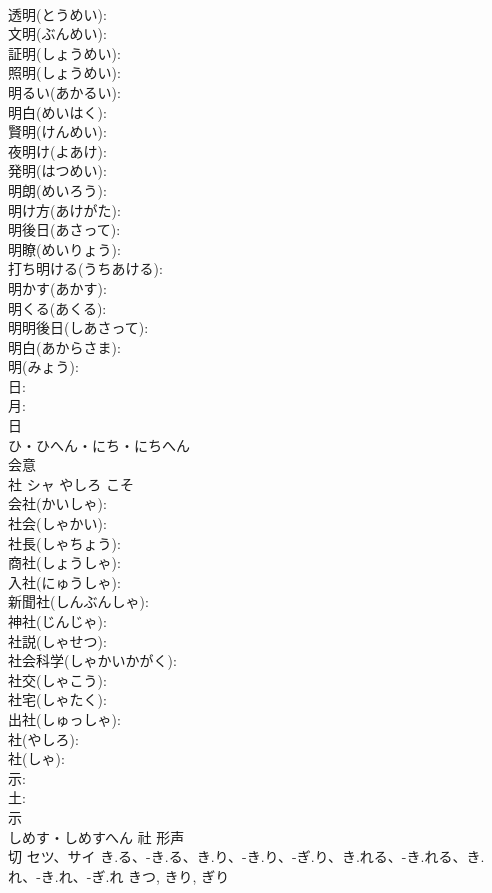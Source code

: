 \documentclass[8pt]{extreport}
\begin{document}
\begin{CJK}{UTF8}{min}
\\	透明(とうめい): 
\\	文明(ぶんめい): 
\\	証明(しょうめい): 
\\	照明(しょうめい): 
\\	明るい(あかるい): 
\\	明白(めいはく): 
\\	賢明(けんめい): 
\\	夜明け(よあけ): 
\\	発明(はつめい): 
\\	明朗(めいろう): 
\\	明け方(あけがた): 
\\	明後日(あさって): 
\\	明瞭(めいりょう): 
\\	打ち明ける(うちあける): 
\\	明かす(あかす): 
\\	明くる(あくる): 
\\	明明後日(しあさって): 
\\	明白(あからさま): 
\\	明(みょう): 
\\	日: 
\\	月: 
\\	日	
\\	ひ・ひへん・にち・にちへん	
\\	会意 
\\	社	シャ	やしろ	こそ	
\\	会社(かいしゃ): 
\\	社会(しゃかい): 
\\	社長(しゃちょう): 
\\	商社(しょうしゃ): 
\\	入社(にゅうしゃ): 
\\	新聞社(しんぶんしゃ): 
\\	神社(じんじゃ): 
\\	社説(しゃせつ): 
\\	社会科学(しゃかいかがく): 
\\	社交(しゃこう): 
\\	社宅(しゃたく): 
\\	出社(しゅっしゃ): 
\\	社(やしろ): 
\\	社(しゃ): 
\\	示: 
\\	土: 
\\	示	
\\	しめす・しめすへん	社	形声 
\\	切	セツ、サイ	き.る、-き.る、き.り、-き.り、-ぎ.り、き.れる、-き.れる、き.れ、-き.れ、-ぎ.れ	きつ, きり, ぎり	

\end{CJK}
\end{document}

